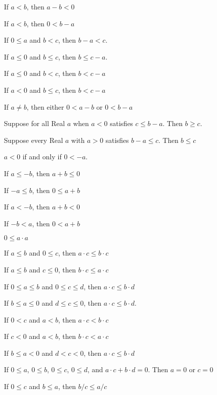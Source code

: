 \documentclass{article}
\let\xrbreak\medbreak
\begin{document}
\begin{thm}
\item\label{xreal1:49} If $a<b$, then $a-b<0$
\item\label{xreal1:50} If $a<b$, then $0<b-a$
\item\label{xreal1:51} If $0\leq a$ and $b<c$, then $b-a<c$.
\item\label{xreal1:52} If $a\leq 0$ and $b\leq c$, then $b\leq c-a$.
\item\label{xreal1:53} If $a\leq0$ and $b<c$, then $b<c-a$
\item\label{xreal1:54} If $a<0$ and $b\leq c$, then $b<c-a$
\item\label{xreal1:55} If $a\neq b$, then either $0<a-b$ or $0<b-a$
  \xrbreak
\item\label{xreal1:56} Suppose for all Real $a$ when $a<0$ satisfies $c\leq b-a$.
  Then $b\geq c$.
\item\label{xreal1:57} Suppose every Real $a$ with $a>0$ satisfies
  $b-a\leq c$. Then $b\leq c$
  \xrbreak
\item\label{xreal1:58} $a<0$ if and only if $0<-a$.
\item\label{xreal1:59} If $a\leq-b$, then $a+b\leq0$
\item\label{xreal1:60} If $-a\leq b$, then $0\leq a+b$
\item\label{xreal1:61} If $a<-b$, then $a+b<0$
\item\label{xreal1:62} If $-b<a$, then $0<a+b$
  \xrbreak
\item\label{xreal1:63} $0\leq a\cdot a$
\item\label{xreal1:64} If $a\leq b$ and $0\leq c$, then $a\cdot c\leq b\cdot c$
\item\label{xreal1:65} If $a\leq b$ and $c\leq0$, then $b\cdot c\leq a\cdot c$
\item\label{xreal1:66} If $0\leq a\leq b$ and $0\leq c\leq d$,
  then $a\cdot c\leq b\cdot d$
\item\label{xreal1:67} If $b\leq a\leq 0$ and $d\leq c\leq 0$, then
  $a\cdot c\leq b\cdot d$.
\item\label{xreal1:68} If $0<c$ and $a<b$, then $a\cdot c<b\cdot c$
\item\label{xreal1:69} If $c<0$ and $a<b$, then $b\cdot c<a\cdot c$
\item\label{xreal1:70} If $b\leq a<0$ and $d<c<0$, then $a\cdot c\leq b\cdot d$
  \xrbreak
\item\label{xreal1:71} If $0\leq a$, $0\leq b$, $0\leq c$, $0\leq d$,
  and $a\cdot c+b\cdot d=0$. Then $a=0$ or $c=0$
  \xrbreak
\item\label{xreal1:72} If $0\leq c$ and $b\leq a$, then $b/c\leq a/c$

\end{thm}
\end{document}
